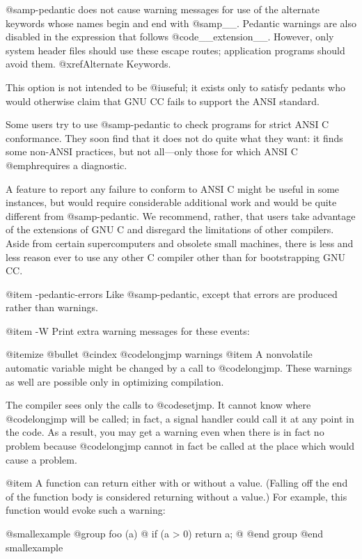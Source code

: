 {@samp{-pedantic} does not cause warning messages for use of the
alternate keywords whose names begin and end with @samp{__}.  Pedantic
warnings are also disabled in the expression that follows
@code{__extension__}.  However, only system header files should use
these escape routes; application programs should avoid them.
@xref{Alternate Keywords}.

This option is not intended to be @i{useful}; it exists only to satisfy
pedants who would otherwise claim that GNU CC fails to support the ANSI
standard.

Some users try to use @samp{-pedantic} to check programs for strict ANSI
C conformance.  They soon find that it does not do quite what they want:
it finds some non-ANSI practices, but not all---only those for which
ANSI C @emph{requires} a diagnostic.

A feature to report any failure to conform to ANSI C might be useful in
some instances, but would require considerable additional work and would
be quite different from @samp{-pedantic}.  We recommend, rather, that
users take advantage of the extensions of GNU C and disregard the
limitations of other compilers.  Aside from certain supercomputers and
obsolete small machines, there is less and less reason ever to use any
other C compiler other than for bootstrapping GNU CC.

@item -pedantic-errors
Like @samp{-pedantic}, except that errors are produced rather than
warnings.

@item -W
Print extra warning messages for these events:

@itemize @bullet
@cindex @code{longjmp} warnings
@item
A nonvolatile automatic variable might be changed by a call to
@code{longjmp}.  These warnings as well are possible only in
optimizing compilation.

The compiler sees only the calls to @code{setjmp}.  It cannot know
where @code{longjmp} will be called; in fact, a signal handler could
call it at any point in the code.  As a result, you may get a warning
even when there is in fact no problem because @code{longjmp} cannot
in fact be called at the place which would cause a problem.

@item
A function can return either with or without a value.  (Falling
off the end of the function body is considered returning without
a value.)  For example, this function would evoke such a
warning:

@smallexample
@group
foo (a)
@{
  if (a > 0)
    return a;
@}
@end group
@end smallexample

}
